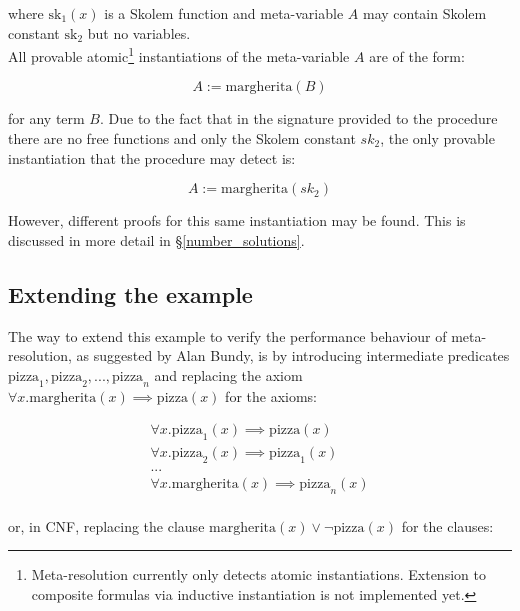 \documentclass[12pt,a4paper]{article}
\begin{document}
\noindent where $\text{sk}_1(x)$ is a Skolem function and meta-variable $A$ may contain Skolem constant $\text{sk}_2$ but no variables.\\

All provable atomic\footnote{Meta-resolution currently only detects atomic instantiations. Extension to composite formulas via inductive instantiation is not implemented yet.} instantiations of the meta-variable $A$ are of the form:

\begin{equation}
A := \text{margherita}(B)
\end{equation}

\noindent for any term $B$. Due to the fact that in the signature provided to the procedure there are no free functions and only the Skolem constant $sk_2$, the only provable instantiation that the procedure may detect is:

\begin{equation}
A := \text{margherita}(sk_2)
\end{equation}

However, different proofs for this same instantiation may be found. This is discussed in more detail in \S \ref{number_solutions}.\\

\subsection{Extending the example}
\label{extending_example}

The way to extend this example to verify the performance behaviour of meta-resolution, as suggested by Alan Bundy, is by introducing intermediate predicates $\text{pizza}_1, \text{pizza}_2, ..., \text{pizza}_n$ and replacing the axiom $\forall x. \text{margherita}(x) \implies \text{pizza}(x)$ for the axioms:

\begin{equation}
\begin{array}{l}
\forall x. \text{pizza}_1(x) \implies \text{pizza}(x)\\
\forall x. \text{pizza}_2(x) \implies \text{pizza}_1(x)\\
...\\
\forall x. \text{margherita}(x) \implies \text{pizza}_n(x)\\
\end{array}
\end{equation}

\noindent or, in CNF, replacing the clause $\text{margherita}(x) \lor \neg \text{pizza}(x)$ for the clauses:
\end{document}
